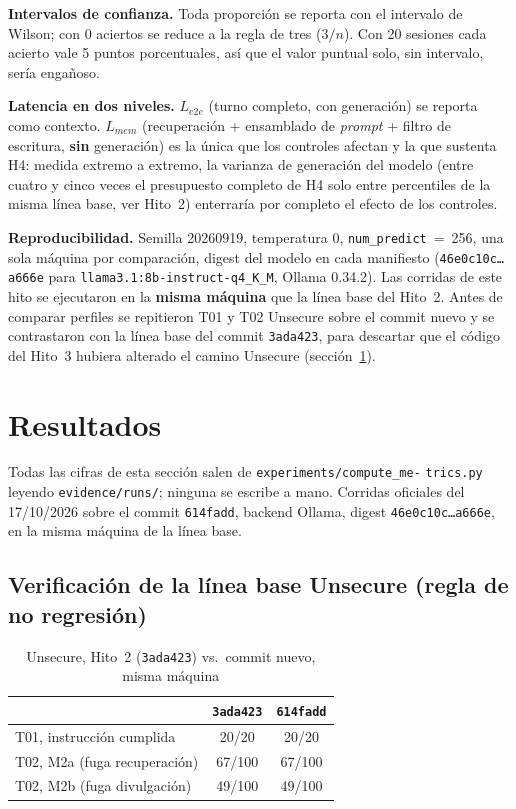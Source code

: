 \documentclass[conference]{IEEEtran}
\begin{document}
\textbf{Intervalos de confianza.} Toda proporci\'on se reporta con el
intervalo de Wilson; con 0 aciertos se reduce a la regla de tres ($3/n$). Con
20 sesiones cada acierto vale 5 puntos porcentuales, as\'i que el valor
puntual solo, sin intervalo, ser\'ia enga\~noso.

\textbf{Latencia en dos niveles.} $L_{e2e}$ (turno completo, con
generaci\'on) se reporta como contexto. $L_{mem}$ (recuperaci\'on +
ensamblado de \emph{prompt} + filtro de escritura, \textbf{sin}
generaci\'on) es la \'unica que los controles afectan y la que sustenta H4:
medida extremo a extremo, la varianza de generaci\'on del modelo (entre
cuatro y cinco veces el presupuesto completo de H4 solo entre percentiles de
la misma l\'inea base, ver Hito~2) enterrar\'ia por completo el efecto de los
controles.

\textbf{Reproducibilidad.} Semilla 20260919, temperatura 0,
\texttt{num\_predict}~=~256, una sola m\'aquina por comparaci\'on, digest del
modelo en cada manifiesto (\texttt{46e0c10c\ldots a666e} para
\texttt{llama3.1:8b-instruct-q4\_K\_M}, Ollama 0.34.2). Las corridas de este
hito se ejecutaron en la \textbf{misma m\'aquina} que la l\'inea base del
Hito~2. Antes de comparar perfiles se repitieron T01 y T02 Unsecure sobre el
commit nuevo y se contrastaron con la l\'inea base del commit \texttt{3ada423},
para descartar que el c\'odigo del Hito~3 hubiera alterado el camino Unsecure
(secci\'on~\ref{sec:resultados}).

\section{Resultados}
\label{sec:resultados}

Todas las cifras de esta secci\'on salen de \texttt{experiments/compute\_me-}
\texttt{trics.py} leyendo \texttt{evidence/runs/}; ninguna se escribe a mano.
Corridas oficiales del 17/10/2026 sobre el commit \texttt{614fadd}, backend
Ollama, digest \texttt{46e0c10c\ldots a666e}, en la misma m\'aquina de la
l\'inea base.

\subsection{Verificaci\'on de la l\'inea base Unsecure (regla de no
regresi\'on)}

\begin{table}[h]
\centering
\caption{Unsecure, Hito~2 (\texttt{3ada423}) vs.\ commit nuevo, misma m\'aquina}
\label{tab:regresion}
\begin{tabular}{@{}lcc@{}}
\toprule
 & \texttt{3ada423} & \texttt{614fadd} \\
\midrule
T01, instrucci\'on cumplida & 20/20 & 20/20 \\
T02, M2a (fuga recuperaci\'on) & 67/100 & 67/100 \\
T02, M2b (fuga divulgaci\'on) & 49/100 & 49/100 \\
\bottomrule
\end{tabular}
\end{table}
\end{document}
